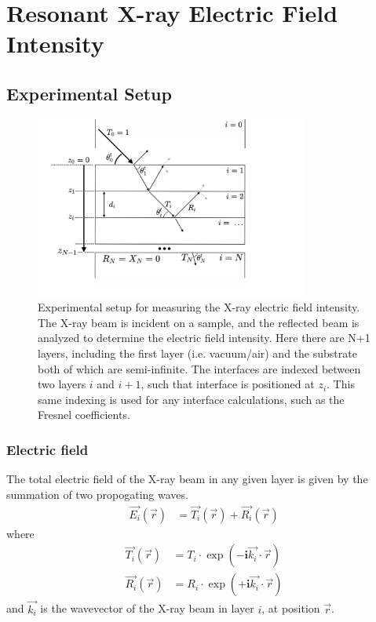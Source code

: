 \documentclass[../main.tex]{subfiles}
\begin{document}
	\chapter{Resonant X-ray Electric Field Intensity}\label{chap:07-res-XEFI}
	\section{Experimental Setup}

	\begin{figure}[H]
		\centering
		\includegraphics[width=0.8\textwidth]{resources/ch7/geometry.png}
		\caption{Experimental setup for measuring the X-ray electric field intensity. The X-ray beam is incident on a sample, and the reflected beam is analyzed to determine the electric field intensity. Here there are N+1 layers, including the first layer (i.e. vacuum/air) and the substrate both of which are semi-infinite. The interfaces are indexed between two layers $i$ and $i+1$, such that interface is positioned at $z_i$. This same indexing is used for any interface calculations, such as the Fresnel coefficients.}
		\label{fig:experimental-setup}
	\end{figure}

	\subsection{Electric field}
	The total electric field of the X-ray beam in any given layer is given by the summation of two propogating waves.
	\begin{align}
		\vec{E_i}(\vec{r}) &= \vec{T_i}(\vec{r}) + \vec{R_i}(\vec{r})
	\end{align}
	where 
	\begin{align}
		\vec{T_i}(\vec{r}) &= T_i \cdot \exp\left(-\mathbf{i} \vec{k_{i}} \cdot \vec{r}\right) \\
		\vec{R_i}(\vec{r}) &= R_i \cdot \exp\left(+\mathbf{i} \vec{k_{i}} \cdot \vec{r}\right)
	\end{align}
	and $\vec{k_i}$ is the wavevector of the X-ray beam in layer $i$, at position $\vec{r}$.
	
\end{document}
